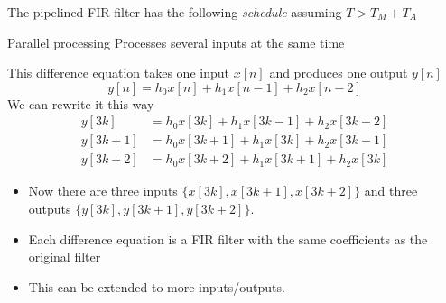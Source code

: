 \documentclass[10pt, handout]{beamer}
\begin{document}
\begin{frame}
The pipelined FIR filter has the following \textit{schedule} assuming $T > T_M + T_A$ 

\begin{center}
	\def\PIPE{1}
	\resizebox{0.8\textwidth}{!}{}
\end{center}

\begin{center}
\end{center}

\end{frame}

\begin{frame}{Parallel processing}
Processes several inputs at the same time

This difference equation takes one input $x[n]$ and produces one output $y[n]$
\begin{equation*}
y[n] = h_0x[n] + h_1x[n-1] + h_2x[n-2]
\end{equation*}
\pause
We can rewrite it this way
\begin{align*}
y[3k] &= h_0x[3k] + h_1x[3k-1] + h_2x[3k-2] \\
y[3k+1] &= h_0x[3k+1] + h_1x[3k] + h_2x[3k-1] \\
y[3k+2] &= h_0x[3k+2] + h_1x[3k+1] + h_2x[3k]
\end{align*}

\begin{itemize}
	\item Now there are three inputs $\{x[3k], x[3k+1], x[3k+2]\}$ and three outputs $\{y[3k], y[3k+1], y[3k+2]\}$.
	\item Each difference equation is a FIR filter with the same coefficients as the original filter
	\item This can be extended to more inputs/outputs.
\end{itemize}
\end{frame}
\end{document}
